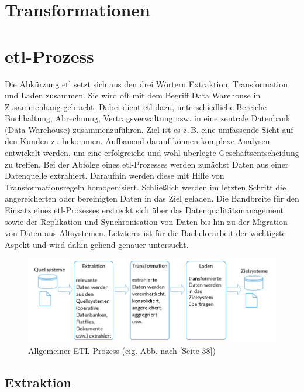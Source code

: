 \section{Transformationen}

\section{\acrshort{etl}-Prozess}
Die Abkürzung \acrshort{etl} setzt sich aus den drei Wörtern Extraktion, Transformation und Laden zusammen. Sie wird oft mit dem Begriff Data Warehouse in Zusammenhang gebracht. Dabei dient \acrshort{etl} dazu, unterschiedliche Bereiche Buchhaltung, Abrechnung, Vertragsverwaltung usw. in eine zentrale Datenbank (Data Warehouse) zusammenzuführen. Ziel ist es z.\,B. eine umfassende Sicht auf den Kunden zu bekommen. Aufbauend darauf können komplexe Analysen entwickelt werden, um eine erfolgreiche und wohl überlegte Geschäftsentscheidung zu treffen. Bei der Abfolge eines \acrshort{etl}-Prozesses werden zunächst Daten aus einer Datenquelle extrahiert. Daraufhin werden diese mit Hilfe von Transformationsregeln homogenisiert. Schließlich werden im letzten Schritt die angereicherten oder bereinigten Daten in das Ziel geladen. Die Bandbreite für den Einsatz eines \acrshort{etl}-Prozesses erstreckt sich über das Datenqualitätsmanagement sowie der Replikation und Synchronisation von Daten bis hin zu der Migration von Daten aus Altsystemen. Letzteres ist für die Bachelorarbeit der wichtigste Aspekt und wird dahin gehend genauer untersucht. \cite{Rossak2013}
\begin{figure}[ht]
	\begin{center}
		\includegraphics[scale=0.65]{bilder/ETL-Prozess.png}
		\caption{Allgemeiner ETL-Prozess (eig. Abb. nach \cite{Rossak2013}[Seite 38])}
		\label{pic:ETL:Pro}
	\end{center}
\end{figure}
\subsection{Extraktion}

